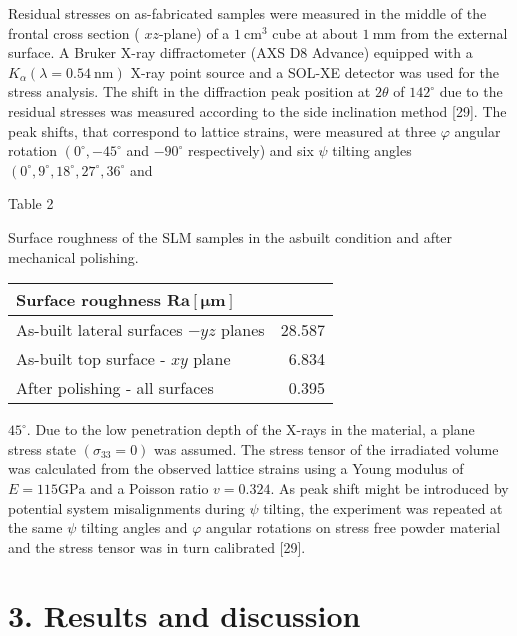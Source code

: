 \documentclass[10pt]{article}
\begin{document}
Residual stresses on as-fabricated samples were measured in the middle of the frontal cross section ( $x z$-plane) of a $1 \mathrm{~cm}^{3}$ cube at about $1 \mathrm{~mm}$ from the external surface. A Bruker X-ray diffractometer (AXS D8 Advance) equipped with a $K_{\alpha}(\lambda=0.54 \mathrm{~nm})$ X-ray point source and a SOL-XE detector was used for the stress analysis. The shift in the diffraction peak position at $2 \theta$ of $142^{\circ}$ due to the residual stresses was measured according to the side inclination method [29]. The peak shifts, that correspond to lattice strains, were measured at three $\varphi$ angular rotation $\left(0^{\circ},-45^{\circ}\right.$ and $-90^{\circ}$ respectively) and six $\psi$ tilting angles $\left(0^{\circ}, 9^{\circ}, 18^{\circ}, 27^{\circ}, 36^{\circ}\right.$ and

Table 2

Surface roughness of the SLM samples in the asbuilt condition and after mechanical polishing.

\begin{center}
\begin{tabular}{lr}
\hline
Surface roughness $\mathbf{R a}[\boldsymbol{\mu m}]$ &  \\
\hline
As-built lateral surfaces $-y z$ planes & 28.587 \\
As-built top surface - $x y$ plane & 6.834 \\
After polishing - all surfaces & 0.395 \\
\hline
\end{tabular}
\end{center}

$45^{\circ}$. Due to the low penetration depth of the X-rays in the material, a plane stress state $\left(\sigma_{33}=0\right)$ was assumed. The stress tensor of the irradiated volume was calculated from the observed lattice strains using a Young modulus of $E=115 \mathrm{GPa}$ and a Poisson ratio $v=0.324$. As peak shift might be introduced by potential system misalignments during $\psi$ tilting, the experiment was repeated at the same $\psi$ tilting angles and $\varphi$ angular rotations on stress free powder material and the stress tensor was in turn calibrated [29].

\section*{3. Results and discussion}
\end{document}
